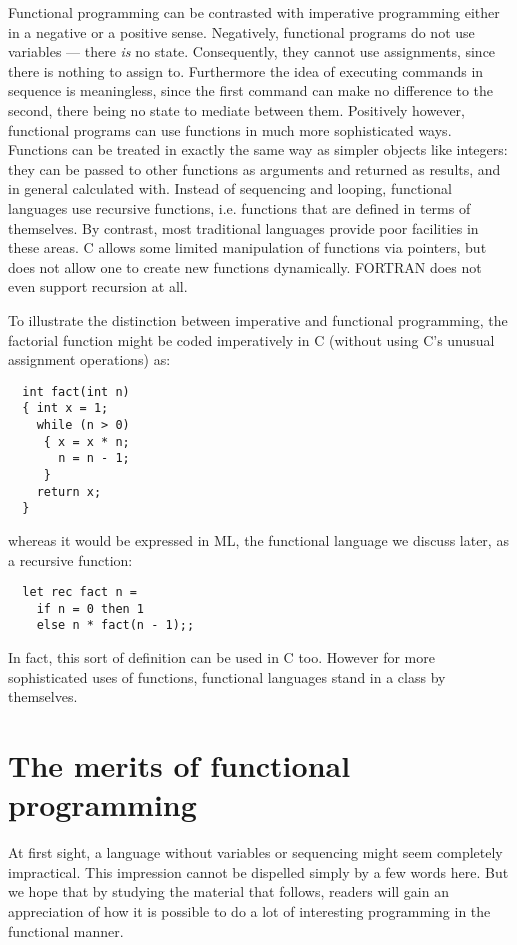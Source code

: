 Functional programming can be contrasted with imperative programming either
in a negative or a positive sense. Negatively, functional programs do not use
variables --- there {\em is} no state. Consequently, they cannot use
assignments, since there is nothing to assign to. Furthermore the idea of
executing commands in sequence is meaningless, since the first command can make
no difference to the second, there being no state to mediate between them.
Positively however, functional programs can use functions in much more
sophisticated ways. Functions can be treated in exactly the same way as simpler
objects like integers: they can be passed to other functions as arguments and
returned as results, and in general calculated with. Instead of sequencing and
looping, functional languages use recursive functions, i.e. functions that are
defined in terms of themselves. By contrast, most traditional languages provide
poor facilities in these areas. C allows some limited manipulation of functions
via pointers, but does not allow one to create new functions dynamically.
FORTRAN does not even support recursion at all.

To illustrate the distinction between imperative and functional programming,
the factorial function might be coded imperatively in C (without using C's
unusual assignment operations) as:

\begin{verbatim}
  int fact(int n)
  { int x = 1;
    while (n > 0)
     { x = x * n;
       n = n - 1;
     }
    return x;
  }
\end{verbatim}

\noindent whereas it would be expressed in ML, the functional language we
discuss later, as a recursive function:

\begin{verbatim}
  let rec fact n =
    if n = 0 then 1
    else n * fact(n - 1);;
\end{verbatim}

In fact, this sort of definition can be used in C too. However for more
sophisticated uses of functions, functional languages stand in a class by
themselves.

\section{The merits of functional programming}

At first sight, a language without variables or sequencing might seem
completely impractical. This impression cannot be dispelled simply by a few
words here. But we hope that by studying the material that follows, readers
will gain an appreciation of how it is possible to do a lot of interesting
programming in the functional manner.

